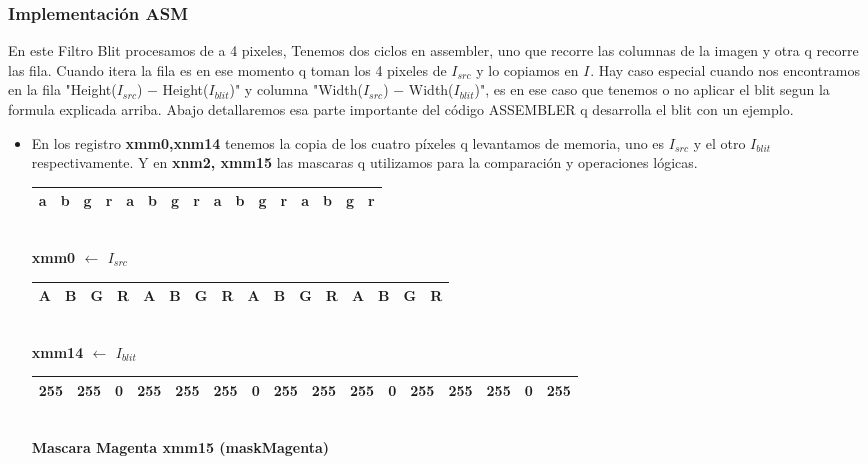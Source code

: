 \subsubsection{Implementación ASM}

En este Filtro Blit procesamos de a 4 pixeles, Tenemos dos ciclos en assembler, uno que recorre las columnas de la imagen y otra q recorre las fila.
Cuando itera la fila es en ese momento q toman los 4 pixeles de $I_{src}$ y lo copiamos en $I_{}$.
Hay caso especial cuando nos encontramos en la fila "Height($I_{src}$) $-$ Height($I_{blit}$)" y columna "Width($I_{src}$) $-$ Width($I_{blit}$)", es en ese caso que tenemos o no aplicar el blit segun la formula explicada arriba.
Abajo detallaremos esa parte importante del código ASSEMBLER q desarrolla el blit con un ejemplo.	

\begin{itemize}

	\item En los registro \textbf{xmm0,xnm14} tenemos la copia de los cuatro píxeles q levantamos de memoria, uno es $I_{src}$ y el otro $I_{blit}$ respectivamente.
			Y en \textbf{xnm2, xmm15} las mascaras q utilizamos para la comparación y operaciones lógicas.

		\begin{center}
		   \begin{tabular}{| c | c | c | c || c | c | c | c || c | c | c | c || c | c | c | c |}
			 \hline
			 a & b & g & r & a & b & g & r & a & b & g & r & a & b & g & r \\ \hline
		   \end{tabular}
		   \\ \textbf{xmm0 $\gets$ $I_{src}$ }
		\end{center}

		\begin{center}
		   \begin{tabular}{| c | c | c | c || c | c | c | c || c | c | c | c || c | c | c | c |}
			 \hline
			 A & B & G & R & A & B & G & R & A & B & G & R & A & B & G & R \\ \hline
		   \end{tabular}
		   \\ \textbf{xmm14 $\gets$ $I_{blit}$ }
		\end{center}
		
		 
		\begin{center}
		   \begin{tabular}{| c | c | c | c || c | c | c | c || c | c | c | c || c | c | c | c |}
			 \hline
			 255 & 255 & 0 & 255 & 255 & 255 & 0 & 255 & 255 & 255 & 0 & 255 & 255 & 255 & 0 & 255 \\ \hline
		   \end{tabular}
		   \\  \textbf{Mascara Magenta xmm15 (maskMagenta)}
		\end{center}


\end{itemize}
